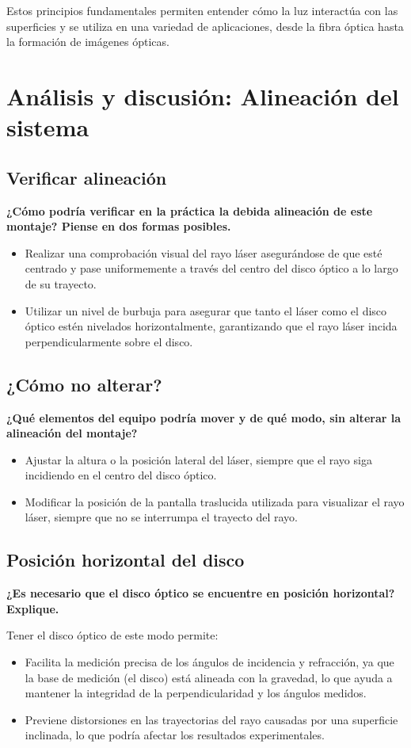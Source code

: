 Estos principios fundamentales permiten entender cómo la luz interactúa con las superficies y se utiliza en una variedad de aplicaciones, desde la fibra óptica hasta la formación de imágenes ópticas.

\section{Análisis y discusión: Alineación del sistema}

\subsection{Verificar alineación}
\textbf{¿Cómo podría verificar en la práctica la debida alineación de este montaje? Piense en dos formas posibles.}
\begin{itemize}
  \item Realizar una comprobación visual del rayo láser asegurándose de que esté centrado y pase uniformemente a través del centro del disco óptico a lo largo de su trayecto.
  \item Utilizar un nivel de burbuja para asegurar que tanto el láser como el disco óptico estén nivelados horizontalmente, garantizando que el rayo láser incida perpendicularmente sobre el disco.
\end{itemize}

\subsection{¿Cómo no alterar?}
\textbf{¿Qué elementos del equipo podría mover y de qué modo, sin alterar la alineación del montaje?}
\begin{itemize}
    \item Ajustar la altura o la posición lateral del láser, siempre que el rayo siga incidiendo en el centro del disco óptico.
    \item Modificar la posición de la pantalla traslucida utilizada para visualizar el rayo láser, siempre que no se interrumpa el trayecto del rayo.
\end{itemize}

\subsection{Posición horizontal del disco}
\textbf{¿Es necesario que el disco óptico se encuentre en posición horizontal? Explique.}

Tener el disco óptico de este modo permite:
\begin{itemize}
    \item Facilita la medición precisa de los ángulos de incidencia y refracción, ya que la base de medición (el disco) está alineada con la gravedad, lo que ayuda a mantener la integridad de la perpendicularidad y los ángulos medidos.
    \item Previene distorsiones en las trayectorias del rayo causadas por una superficie inclinada, lo que podría afectar los resultados experimentales.
\end{itemize}

